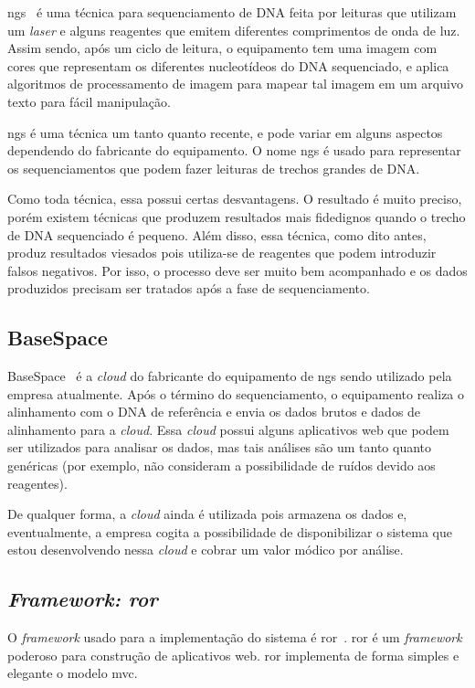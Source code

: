 \gls{ngs}~\cite{NGEN} é uma técnica para sequenciamento de DNA feita por leituras que utilizam um \textit{laser} e alguns reagentes que emitem
diferentes comprimentos de onda de luz. Assim sendo, após um ciclo de leitura, o equipamento tem uma imagem com cores que representam
os diferentes nucleotídeos do DNA sequenciado, e aplica algoritmos de processamento de imagem para mapear tal imagem em um arquivo
texto para fácil manipulação.

\gls{ngs} é uma técnica um tanto quanto recente, e pode variar em alguns aspectos dependendo do fabricante do equipamento. O nome \gls{ngs}
é usado para representar os sequenciamentos que podem fazer leituras de trechos grandes de DNA.

Como toda técnica, essa possui certas desvantagens. O resultado é muito preciso, porém existem técnicas que produzem resultados mais fidedignos
quando o trecho de DNA sequenciado é pequeno. Além disso, essa técnica, como dito antes, produz resultados viesados pois utiliza-se de reagentes
que podem introduzir falsos negativos. Por isso, o processo deve ser muito bem acompanhado e os dados produzidos precisam ser tratados após a fase de
sequenciamento.

\subsection{BaseSpace}

BaseSpace~\cite{BS} é a \textit{cloud} do fabricante do equipamento 
de \gls{ngs} sendo
utilizado pela empresa atualmente. Após o término do sequenciamento,
o equipamento realiza o alinhamento com o DNA de referência e envia os dados
brutos e dados de alinhamento para a \textit{cloud}. Essa \textit{cloud}
possui alguns aplicativos web que podem ser utilizados para analisar
os dados, mas tais análises são um tanto quanto genéricas (por exemplo, 
não consideram a possibilidade de ruídos devido aos reagentes).

De qualquer forma, a \textit{cloud} ainda é utilizada pois armazena os dados
e, eventualmente, a empresa cogita a possibilidade de disponibilizar o sistema
que estou desenvolvendo nessa \textit{cloud} e cobrar um valor módico por análise.

\subsection{\textit{Framework: \gls{ror}}}

O \textit{framework} usado para a implementação do sistema é \gls{ror}~\cite{RoR}.
\gls{ror} é um \textit{framework} poderoso para construção de aplicativos web. \gls{ror} implementa de forma simples e elegante
o modelo \gls{mvc}.

